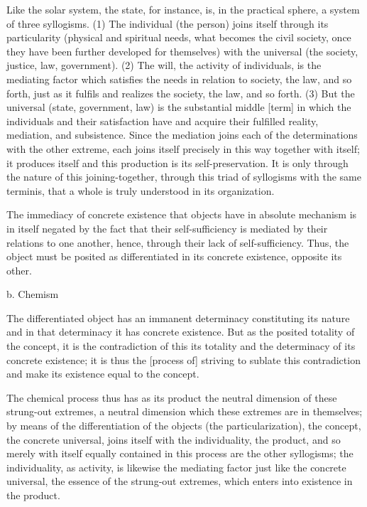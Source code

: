 Like the solar system, the state, for instance, is,
in the practical sphere, a system of three syllogisms.
(1) The individual (the person) joins itself through its particularity
(physical and spiritual needs, what becomes the civil society,
once they have been further developed for themselves)
with the universal (the society, justice, law, government).
(2) The will, the activity of individuals, is the mediating factor
which satisfies the needs in relation to society, the law, and so forth,
just as it fulfils and realizes the society, the law, and so forth.
(3) But the universal (state, government, law) is the substantial middle [term]
in which the individuals and their satisfaction have and acquire
their fulfilled reality, mediation, and subsistence.
Since the mediation joins each of the determinations with the other extreme,
each joins itself precisely in this way together with itself;
it produces itself and this production is its self-preservation.
It is only through the nature of this joining-together,
through this triad of syllogisms with the same terminis,
that a whole is truly understood in its organization.

The immediacy of concrete existence
that objects have in absolute mechanism
is in itself negated by the fact that
their self-sufficiency is mediated by
their relations to one another, hence,
through their lack of self-sufficiency.
Thus, the object must be posited as
differentiated in its concrete existence,
opposite its other.

b. Chemism

The differentiated object has an immanent determinacy constituting
its nature and in that determinacy it has concrete existence.
But as the posited totality of the concept, it is the contradiction of
this its totality and the determinacy of its concrete existence;
it is thus the [process of] striving to sublate this contradiction
and make its existence equal to the concept.

The chemical process thus has as its product the neutral dimension of
these strung-out extremes, a neutral dimension which these extremes are
in themselves; by means of the differentiation of the objects (the particularization),
the concept, the concrete universal, joins itself
with the individuality, the product, and so merely
with itself equally contained in this process are the other syllogisms;
the individuality, as activity, is likewise the mediating factor just like the concrete universal,
the essence of the strung-out extremes, which enters into existence in the product.

